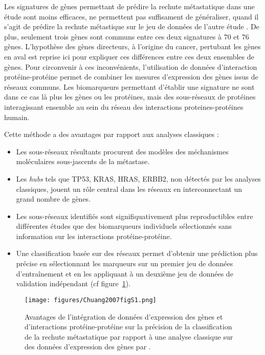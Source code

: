			Les signatures de gènes permettant de prédire la rechute métastatique dans une étude sont moins efficaces, ne permettent pas suffisament de généraliser, quand il s'agit de prédire la rechute métastique sur le jeu de données de l'autre étude \citep{EinDor2006}.
			De plus, seulement trois gènes sont communs entre ces deux signatures à 70 et 76 gènes.
			L'hypothèse des gènes directeurs, à l'origine du cancer, pertubant les gènes en aval est reprise ici pour expliquer ces différences entre ces deux ensembles de gènes.
			Pour circonvenir à ces inconvénients, l'utilisation de données d'interaction protéine-protéine permet de combiner les mesures d'expression des gènes issus de réseaux communs.
			Les biomarqueurs permettant d'établir une signature ne sont dans ce cas là plus les gènes ou les protéines, mais des sous-réseaux de protéines interagissant ensemble au sein du réseau des interactions proteines-protéines humain.

			Cette méthode a des avantages par rapport aux analyses classiques :
			\begin{itemize}
				\item Les sous-réseaux résultants procurent des modèles des méchanismes moléculaires sous-jascents de la métastase.
				\item Les \emph{hubs} tels que \acs{TP53}, \acs{KRAS}, \acs{HRAS}, \acs{ERBB2}, non détectés par les analyses classiques, jouent un rôle central dans les réseaux en interconnectant un grand nombre de gènes.
				\item Les sous-réseaux identifiés sont signifiquativement plus reproductibles entre différentes études que des biomarqueurs individuels sélectionnés sans information sur les interactions protéine-protéine.
				\item Une classification basée sur des réseaux permet d'obtenir une prédiction plus précise en sélectionnant les marqueurs sur un premier jeu de données d'entraînement et en les appliquant à un deuxième jeu de données de validation indépendant (cf figure~\ref{fig:Chuang2007figS1}).
			\end{itemize}

			\begin{figure}
				\centering
				\texttt{[image: figures/Chuang2007figS1.png]}
				\caption{Avantages de l'intégration de données d'expression des gènes et d'interactions protéine-protéine sur la précision de la classification de la rechute métastatique par rapport à une analyse classique sur des données d'expression des gènes par \citeauthor{Chuang2007}.}
				\label{fig:Chuang2007figS1}
			\end{figure}

